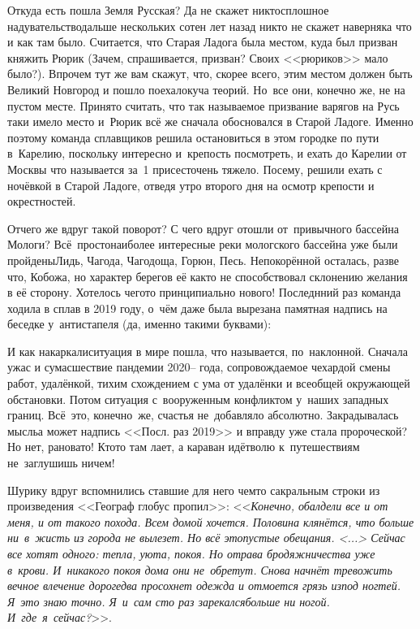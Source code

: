{{Откуда есть пошла Земля Русская? Да не скажет никто\mdash сплошное надувательство\mdash дальше нескольких сотен лет назад никто не скажет наверняка что и как там было. Считается, что Старая Ладога была местом, куда был призван княжить Рюрик (Зачем, спрашивается, призван? Своих <<рюриков>> мало было?). Впрочем тут же вам скажут, что, скорее всего, этим местом должен быть Великий Новгород и пошло поехало\mdash куча теорий. Но~все они, конечно же, не на пустом месте. Принято считать, что так называемое призвание варягов на Русь таки имело место и~Рюрик всё же сначала обосновался в Старой Ладоге. Именно поэтому команда сплавщиков решила остановиться в этом городке по пути в~Карелию, поскольку интересно и~крепость посмотреть, и ехать до Карелии от Москвы что называется за~1 присест\mdash очень тяжело. Посему, решили ехать с ночёвкой в Старой Ладоге, отведя утро второго дня на осмотр крепости и окрестностей. 

Отчего же вдруг такой поворот? С чего вдруг отошли от~привычного бассейна Мологи\cite{СоболевВепсскаяЛетопись}? Всё~просто\mdash наиболее интересные реки мологского бассейна уже были пройдены\mdash Лидь, Чагода, Чагодоща, Горюн, Песь. Непокорённой осталась, разве что, Кобожа, но характер берегов её как\sdash то не способствовал склонению желания в её сторону. Хотелось чего\sdash то принципиально нового! Последнний раз команда ходила в сплав в 2019 году, о~чём даже была вырезана памятная надпись на беседке у~антистапеля (да, именно такими буквами): 
\newpage
{\centering\LARGE{}}

И как накаркали\mdash ситуация в мире пошла, что называется, по~наклонной. Сначала ужас и сумасшествие пандемии 2020\thinspace\nobreakdash-- года, сопровождаемое чехардой смены работ, удалёнкой, тихим схождением с ума от удалёнки и всеобщей окружающей обстановки. Потом ситуация с~вооруженным конфликтом у~наших западных границ. Всё~это, конечно~же, счастья не~добавляло абсолютно. Закрадывалась мысль\mdash а может надпись <<Посл. раз 2019>> и вправду уже стала пророческой? Но нет, рановато! Кто\sdash то там лает, а караван идёт\mdash волю к~путешествиям не~заглушишь ничем!

Шурику вдруг вспомнились ставшие для него чем\sdash то сакральным строки из произведения <<Географ глобус пропил>>: <<\textit{Конечно, обалдели все и от меня, и от такого похода. Всем домой хочется. Половина клянётся, что больше ни~в~жисть из города не вылезет. Но всё это\mdash пустые обещания. <...> Сейчас все хотят одного: тепла, уюта, покоя. Но отрава бродяжничества уже в~крови. И~никакого покоя дома они не~обретут. Снова начнёт тревожить вечное влечение дорог\mdash едва просохнет одежда и отмоется грязь из\sdash под ногтей. Я~это знаю точно. Я~и~сам сто раз зарекался\mdash больше ни ногой. И~где~я~сейчас?}>>\cite{ГеографГлобусПропил}.

}}
